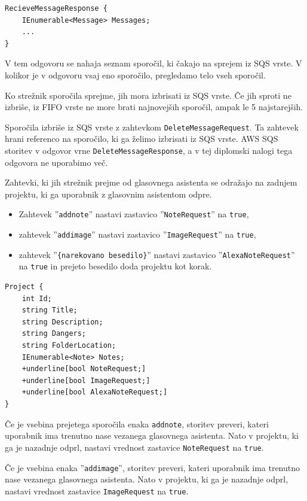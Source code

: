 \documentclass[a4paper, 12pt]{book}
\begin{document}
\begin{Verbatim}[commandchars=+\[\]]
RecieveMessageResponse {
    IEnumerable<Message> Messages;
    ...
}
\end{Verbatim}

V tem odgovoru se nahaja seznam sporočil, ki čakajo na sprejem iz SQS vrste.
V kolikor je v odgovoru vsaj eno sporočilo, pregledamo telo vseh sporočil. 

Ko strežnik sporočila sprejme, jih mora izbrisati iz SQS vrste.
Če jih sproti ne izbriše, iz FIFO vrste ne more brati najnovejših sporočil, ampak le 5 najstarejših.

Sporočila izbriše iz SQS vrste z zahtevkom \texttt{DeleteMessageRequest}.
Ta zahtevek hrani referenco na sporočilo, ki ga želimo izbrisati iz SQS vrste.
AWS SQS storitev v odgovor vrne \texttt{DeleteMessageResponse}, a v tej diplomski nalogi tega odgovora ne uporabimo več.

Zahtevki, ki jih strežnik prejme od glasovnega asistenta se odražajo na zadnjem projektu, ki ga uporabnik z glasovnim asistentom odpre.
\begin{itemize}
	\item Zahtevek ''\texttt{addnote}'' nastavi zastavico ''\texttt{NoteRequest}'' na \texttt{true},
	\item zahtevek ''\texttt{addimage}'' nastavi zastavico ''\texttt{ImageRequest}'' na \texttt{true},
	\item zahtevek ''\texttt{\{narekovano besedilo\}}'' nastavi zastavico ''\texttt{AlexaNoteRequest}'' na \texttt{true} in prejeto besedilo doda projektu kot korak.
\end{itemize}

\begin{Verbatim}[commandchars=+\[\]]
Project { 
    int Id; 
    string Title; 
    string Description; 
    string Dangers; 
    string FolderLocation; 
    IEnumerable<Note> Notes; 
    +underline[bool NoteRequest;] 
    +underline[bool ImageRequest;] 
    +underline[bool AlexaNoteRequest;] 
}
\end{Verbatim}


Če je vsebina prejetega sporočila enaka \texttt{addnote}, storitev preveri, kateri uporabnik ima trenutno nase vezanega glasovnega asistenta.
Nato v projektu, ki ga je nazadnje odprl, nastavi vrednost zastavice \texttt{NoteRequest} na \texttt{true}.


Če je vsebina enaka ''\texttt{addimage}'', storitev preveri, kateri uporabnik ima trenutno nase vezanega glasovnega asistenta.
Nato v projektu, ki ga je nazadnje odprl, nastavi vrednost zastavice \texttt{ImageRequest} na \texttt{true}.
\end{document}

